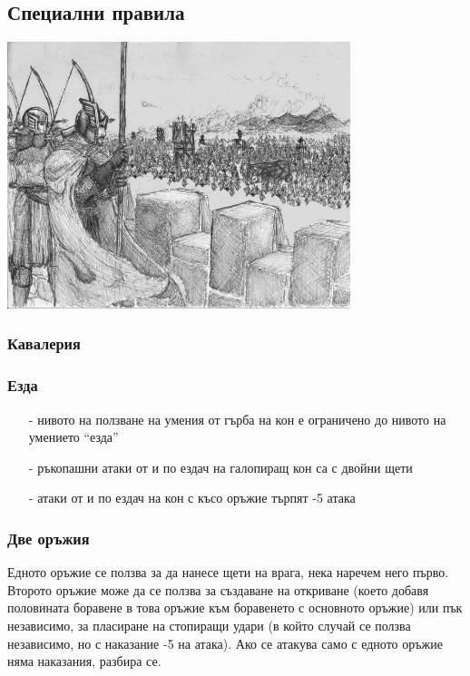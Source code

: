 \subsection{Специални правила}
\begin{center}
\includegraphics[width=0.75\textwidth]{../images/siege}~
\\[1cm]
\end{center}

\subsubsection{Кавалерия}

\subsubsection{Езда}
\begin{itemize}
\item[-]{нивото на ползване на умения от гърба на кон е ограничено до нивото на умението “езда”}
\item[-]{ръкопашни атаки от и по ездач на галопиращ кон са с двойни щети}
\item[-]{атаки от и по ездач на кон с късо оръжие търпят -5 атака}
\end{itemize}

\subsubsection{Две оръжия}
Едното оръжие се ползва за да нанесе щети на врага, нека наречем него първо.
Второто оръжие може да се ползва за създаване на откриване (което добавя половината боравене в това оръжие към боравенето с основното оръжие) или пък независимо, за пласиране на стопиращи удари (в който случай се ползва независимо, но с наказание -5 на атака).
Ако се атакува само с едното оръжие няма наказания, разбира се.

